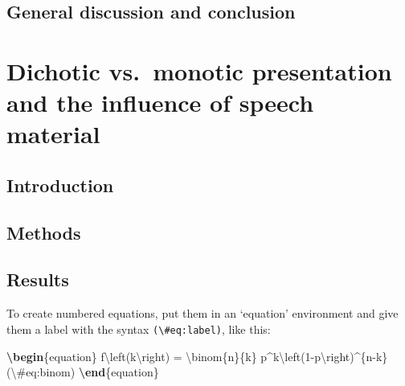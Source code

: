 \documentclass[a4paper, twoside]{templates/ociamthesis}
\newenvironment{Shaded}{\begin{snugshade}}{\end{snugshade}}
\newcommand{\ExtensionTok}[1]{#1}
\newcommand{\KeywordTok}[1]{\textcolor[rgb]{0.13,0.29,0.53}{\textbf{#1}}}
\newcommand{\NormalTok}[1]{#1}
\newcommand{\SpecialCharTok}[1]{\textcolor[rgb]{0.00,0.00,0.00}{#1}}
\newcommand{\SpecialStringTok}[1]{\textcolor[rgb]{0.31,0.60,0.02}{#1}}
\renewenvironment{Shaded}
{
  \vspace{4pt}%
  \begin{snugshade}%
}{%
  \end{snugshade}%
  \vspace{4pt}%
}
\begin{document}
\hypertarget{general-discussion-and-conclusion}{%
\subsection{General discussion and conclusion}\label{general-discussion-and-conclusion}}

\hypertarget{dichotic-vs.-monotic-presentation-and-the-influence-of-speech-material}{%
\section{Dichotic vs.~monotic presentation and the influence of speech material}\label{dichotic-vs.-monotic-presentation-and-the-influence-of-speech-material}}

\hypertarget{introduction-2}{%
\subsection{Introduction}\label{introduction-2}}

\hypertarget{methods-2}{%
\subsection{Methods}\label{methods-2}}

\hypertarget{results-2}{%
\subsection{Results}\label{results-2}}

To create numbered equations, put them in an `equation' environment and give them a label with the syntax \texttt{(\textbackslash{}\#eq:label)}, like this:

\begin{Shaded}
\begin{Highlighting}[]
\KeywordTok{\textbackslash{}begin}\NormalTok{\{}\ExtensionTok{equation}\NormalTok{\}}\SpecialStringTok{ }
\SpecialStringTok{  f}\SpecialCharTok{\textbackslash{}left}\SpecialStringTok{(k}\SpecialCharTok{\textbackslash{}right}\SpecialStringTok{) = }\SpecialCharTok{\textbackslash{}binom}\SpecialStringTok{\{n\}\{k\} p\^{}k}\SpecialCharTok{\textbackslash{}left}\SpecialStringTok{(1{-}p}\SpecialCharTok{\textbackslash{}right}\SpecialStringTok{)\^{}\{n{-}k\}}
\SpecialStringTok{  (}\SpecialCharTok{\textbackslash{}\#}\SpecialStringTok{eq:binom)}
\KeywordTok{\textbackslash{}end}\NormalTok{\{}\ExtensionTok{equation}\NormalTok{\} }
\end{Highlighting}
\end{Shaded}
\end{document}
